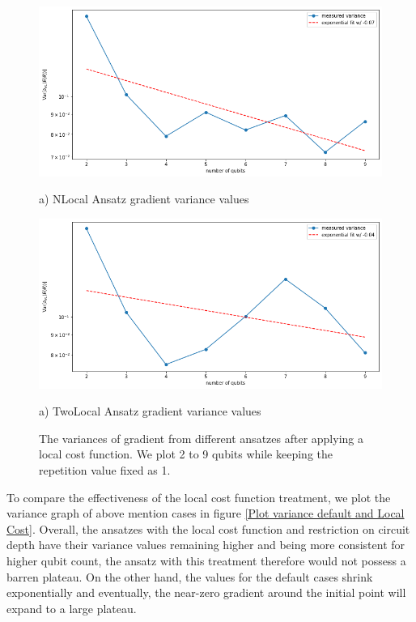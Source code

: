 \begin{figure}
    \includegraphics[width=\textwidth]{Artefact/Appendices/NLocalFixedLocal.png}
    \centerline{a) NLocal Ansatz gradient variance values}
    \includegraphics[width=\textwidth]{Artefact/Appendices/TwoLocalFixedLocal.png}
    \centerline{a) TwoLocal Ansatz gradient variance values}
    \caption{
        The variances of gradient from different ansatzes after applying a local cost function.
        We plot 2 to 9 qubits while keeping the repetition value fixed as 1.
    }
    \label{Plot ansatzes variance local cost}
\end{figure}

To compare the effectiveness of the local cost function treatment, we plot the variance graph of above mention cases in figure \ref{Plot variance default and Local Cost}.
Overall, the ansatzes with the local cost function and restriction on circuit depth have their variance values remaining higher and being more consistent for higher qubit count, the ansatz with this treatment therefore would not possess a barren plateau.
On the other hand, the values for the default cases shrink exponentially and eventually, the near-zero gradient around the initial point will expand to a large plateau.



